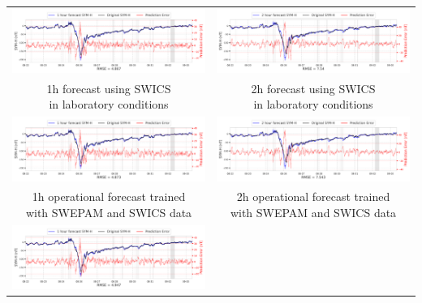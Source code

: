 \documentclass[draft,sw]{agutexSI2019}
\begin{document}
\begin{table}
\centering
\begin{tabular}{cc}
\includegraphics[width=0.49\linewidth]{paper_plots_shade/1h_swics/1h_swics_storm_42.png}
&
\includegraphics[width=0.49\linewidth]{paper_plots_shade/2h_swics/2h_swics_storm_42.png}
\\
\shortstack{1h forecast using SWICS\\ in laboratory conditions} & \shortstack{2h forecast using SWICS\\ in laboratory conditions}
\vspace*{12pt}
\\
\includegraphics[width=0.49\linewidth]{paper_plots_shade/1h_swics_rt/1h_swics_rt_storm_42.png}
&
\includegraphics[width=0.49\linewidth]{paper_plots_shade/2h_swics_rt/2h_swics_rt_storm_42.png}
\\
\shortstack{1h operational forecast trained\\ with SWEPAM and SWICS data} & \shortstack{2h operational forecast trained\\ with SWEPAM and SWICS data}
\vspace*{12pt}
\\
\includegraphics[width=0.49\linewidth]{paper_plots_shade/1h_swepam_rt/1h_swepam_rt_storm_42.png}

\end{tabular}
\end{table}
\end{document}
